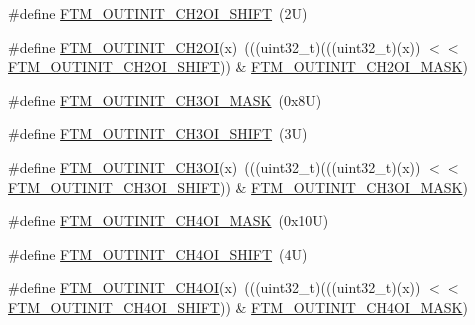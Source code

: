 \begin{DoxyCompactItemize}
\#define \mbox{\hyperlink{group___f_t_m___register___masks_ga25aa50131bfe6d3c09b6508e718bb638}{F\+T\+M\+\_\+\+O\+U\+T\+I\+N\+I\+T\+\_\+\+C\+H2\+O\+I\+\_\+\+S\+H\+I\+FT}}~(2\+U)
\item 
\#define \mbox{\hyperlink{group___f_t_m___register___masks_gaeba168c144acbe442b319fb327b6ed3b}{F\+T\+M\+\_\+\+O\+U\+T\+I\+N\+I\+T\+\_\+\+C\+H2\+OI}}(x)~(((uint32\+\_\+t)(((uint32\+\_\+t)(x)) $<$$<$ \mbox{\hyperlink{group___f_t_m___register___masks_ga25aa50131bfe6d3c09b6508e718bb638}{F\+T\+M\+\_\+\+O\+U\+T\+I\+N\+I\+T\+\_\+\+C\+H2\+O\+I\+\_\+\+S\+H\+I\+FT}})) \& \mbox{\hyperlink{group___f_t_m___register___masks_ga06ffa599245bdf8bb3c19f45a11f96f4}{F\+T\+M\+\_\+\+O\+U\+T\+I\+N\+I\+T\+\_\+\+C\+H2\+O\+I\+\_\+\+M\+A\+SK}})
\item 
\#define \mbox{\hyperlink{group___f_t_m___register___masks_gaaa0b4f972bca3194e69fbe94021f3471}{F\+T\+M\+\_\+\+O\+U\+T\+I\+N\+I\+T\+\_\+\+C\+H3\+O\+I\+\_\+\+M\+A\+SK}}~(0x8\+U)
\item 
\#define \mbox{\hyperlink{group___f_t_m___register___masks_ga083d497bae99715e175c5e73e27d3313}{F\+T\+M\+\_\+\+O\+U\+T\+I\+N\+I\+T\+\_\+\+C\+H3\+O\+I\+\_\+\+S\+H\+I\+FT}}~(3\+U)
\item 
\#define \mbox{\hyperlink{group___f_t_m___register___masks_gafc9350009db91a634c495c3b6002b7fd}{F\+T\+M\+\_\+\+O\+U\+T\+I\+N\+I\+T\+\_\+\+C\+H3\+OI}}(x)~(((uint32\+\_\+t)(((uint32\+\_\+t)(x)) $<$$<$ \mbox{\hyperlink{group___f_t_m___register___masks_ga083d497bae99715e175c5e73e27d3313}{F\+T\+M\+\_\+\+O\+U\+T\+I\+N\+I\+T\+\_\+\+C\+H3\+O\+I\+\_\+\+S\+H\+I\+FT}})) \& \mbox{\hyperlink{group___f_t_m___register___masks_gaaa0b4f972bca3194e69fbe94021f3471}{F\+T\+M\+\_\+\+O\+U\+T\+I\+N\+I\+T\+\_\+\+C\+H3\+O\+I\+\_\+\+M\+A\+SK}})
\item 
\#define \mbox{\hyperlink{group___f_t_m___register___masks_gab451c20f7002deae668749b6a886ca84}{F\+T\+M\+\_\+\+O\+U\+T\+I\+N\+I\+T\+\_\+\+C\+H4\+O\+I\+\_\+\+M\+A\+SK}}~(0x10\+U)
\item 
\#define \mbox{\hyperlink{group___f_t_m___register___masks_gac61997ec656e9289b6b9b4a6df30b548}{F\+T\+M\+\_\+\+O\+U\+T\+I\+N\+I\+T\+\_\+\+C\+H4\+O\+I\+\_\+\+S\+H\+I\+FT}}~(4\+U)
\item 
\#define \mbox{\hyperlink{group___f_t_m___register___masks_ga07bc64daa490dd8483f0be50128615a1}{F\+T\+M\+\_\+\+O\+U\+T\+I\+N\+I\+T\+\_\+\+C\+H4\+OI}}(x)~(((uint32\+\_\+t)(((uint32\+\_\+t)(x)) $<$$<$ \mbox{\hyperlink{group___f_t_m___register___masks_gac61997ec656e9289b6b9b4a6df30b548}{F\+T\+M\+\_\+\+O\+U\+T\+I\+N\+I\+T\+\_\+\+C\+H4\+O\+I\+\_\+\+S\+H\+I\+FT}})) \& \mbox{\hyperlink{group___f_t_m___register___masks_gab451c20f7002deae668749b6a886ca84}{F\+T\+M\+\_\+\+O\+U\+T\+I\+N\+I\+T\+\_\+\+C\+H4\+O\+I\+\_\+\+M\+A\+SK}})
$$
\end{DoxyCompactItemize}

